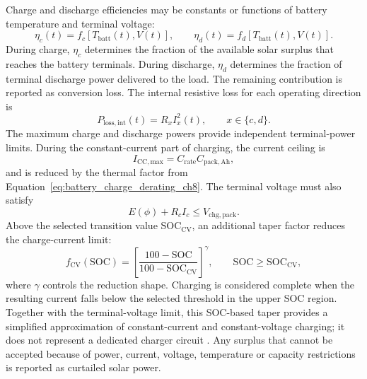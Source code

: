 Charge and discharge efficiencies may be constants or functions of battery
temperature and terminal voltage:
\begin{equation}
    \eta_c(t)
    =
    f_c\!\left[T_{\mathrm{batt}}(t),V(t)\right],
    \qquad
    \eta_d(t)
    =
    f_d\!\left[T_{\mathrm{batt}}(t),V(t)\right].
    \label{eq:battery_efficiency_functions_ch8}
\end{equation}
During charge, $\eta_c$ determines the fraction of the available solar
surplus that reaches the battery terminals. During discharge, $\eta_d$
determines the fraction of terminal discharge power delivered to the load.
The remaining contribution is reported as conversion loss. The internal
resistive loss for each operating direction is
\begin{equation}
    P_{\mathrm{loss,int}}(t)=R_x I_x^2(t),
    \qquad x\in\{c,d\}.
    \label{eq:battery_internal_loss_ch8}
\end{equation}
The maximum charge and discharge powers provide independent terminal-power
limits. During the constant-current part of charging, the current ceiling is
\begin{equation}
    I_{\mathrm{CC,max}}
    =
    C_{\mathrm{rate}}C_{\mathrm{pack,Ah}},
    \label{eq:battery_cc_current_limit_ch8}
\end{equation}
and is reduced by the thermal factor from
Equation~\eqref{eq:battery_charge_derating_ch8}. The terminal voltage must
also satisfy
\begin{equation}
    E(\phi)+R_cI_c
    \leq
    V_{\mathrm{chg,pack}}.
    \label{eq:battery_cv_voltage_limit_ch8}
\end{equation}
Above the selected transition value $\mathrm{SOC}_{\mathrm{CV}}$, an
additional taper factor reduces the charge-current limit:
\begin{equation}
    f_{\mathrm{CV}}(\mathrm{SOC})
    =
    \left[
        \frac{100-\mathrm{SOC}}
        {100-\mathrm{SOC}_{\mathrm{CV}}}
    \right]^{\gamma},
    \qquad
    \mathrm{SOC}\geq\mathrm{SOC}_{\mathrm{CV}},
    \label{eq:battery_cv_taper_ch8}
\end{equation}
where $\gamma$ controls the reduction shape. Charging is considered complete
when the resulting current falls below the selected threshold in the upper
SOC region. Together with the terminal-voltage limit, this SOC-based taper
provides a simplified approximation of constant-current and constant-voltage
charging; it does not represent a dedicated charger circuit
\cite{ti2022charger}. Any surplus that cannot be accepted because of power,
current, voltage, temperature or capacity restrictions is reported as
curtailed solar power.


